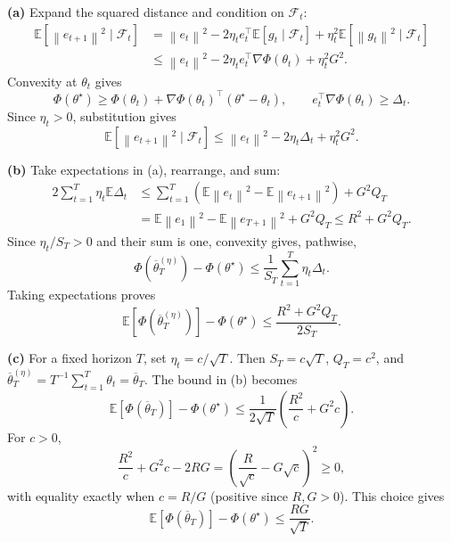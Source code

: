 \documentclass[11pt]{article}
\newcommand{\E}{\mathbb E}
\newcommand{\norm}[1]{\left\lVert#1\right\rVert}
\begin{document}
\textbf{(a)} Expand the squared distance and condition on $\mathcal F_t$:
\begin{align*}
 \E[\norm{e_{t+1}}^2\mid\mathcal F_t]
 &=\norm{e_t}^2-2\eta_t e_t^\top\E[g_t\mid\mathcal F_t]
 +\eta_t^2\E[\norm{g_t}^2\mid\mathcal F_t]\\
 &\leq\norm{e_t}^2-2\eta_t e_t^\top\nabla\Phi(\theta_t)+\eta_t^2G^2.
\end{align*}
Convexity at $\theta_t$ gives
\[
 \Phi(\theta^\star)\geq\Phi(\theta_t)
 +\nabla\Phi(\theta_t)^\top(\theta^\star-\theta_t),
 \qquad e_t^\top\nabla\Phi(\theta_t)\geq\Delta_t.
\]
Since $\eta_t>0$, substitution gives
\[
 \boxed{\E[\norm{e_{t+1}}^2\mid\mathcal F_t]
 \leq\norm{e_t}^2-2\eta_t\Delta_t+\eta_t^2G^2.}
\]

\textbf{(b)} Take expectations in (a), rearrange, and sum:
\begin{align*}
 2\sum_{t=1}^T\eta_t\E\Delta_t
 &\leq\sum_{t=1}^T
 \left(\E\norm{e_t}^2-\E\norm{e_{t+1}}^2\right)+G^2Q_T\\
 &=\E\norm{e_1}^2-\E\norm{e_{T+1}}^2+G^2Q_T
 \leq R^2+G^2Q_T.
\end{align*}
Since $\eta_t/S_T>0$ and their sum is one, convexity gives, pathwise,
\[
 \Phi(\overline\theta_T^{(\eta)})-\Phi(\theta^\star)
 \leq\frac1{S_T}\sum_{t=1}^T\eta_t\Delta_t.
\]
Taking expectations proves
\[
 \boxed{\E[\Phi(\overline\theta_T^{(\eta)})]-\Phi(\theta^\star)
 \leq\frac{R^2+G^2Q_T}{2S_T}.}
\]

\textbf{(c)} For a fixed horizon $T$, set $\eta_t=c/\sqrt T$.
Then $S_T=c\sqrt T$, $Q_T=c^2$, and
$\overline\theta_T^{(\eta)}=T^{-1}\sum_{t=1}^T\theta_t=\overline\theta_T$.
The bound in (b) becomes
\[
 \E[\Phi(\overline\theta_T)]-\Phi(\theta^\star)
 \leq\frac1{2\sqrt T}\left(\frac{R^2}{c}+G^2c\right).
\]
For $c>0$,
\[
 \frac{R^2}{c}+G^2c-2RG
 =\left(\frac R{\sqrt c}-G\sqrt c\right)^2\geq0,
\]
with equality exactly when $c=R/G$ (positive since $R,G>0$).
This choice gives
\[
 \boxed{\E[\Phi(\overline\theta_T)]-\Phi(\theta^\star)\leq\frac{RG}{\sqrt T}}.
\]
\end{document}
